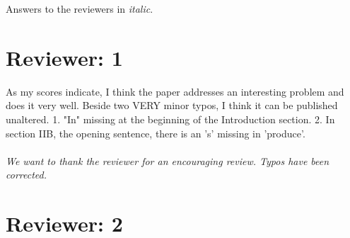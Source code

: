 \documentclass{article}
\begin{document}
Answers to the reviewers in \textit{italic}.

\section*{Reviewer: 1}

As my scores indicate, I think the paper addresses an interesting problem and does it very well. Beside two VERY minor typos, I think it can be published unaltered.
1. "In" missing at the beginning of the Introduction section.
2. In section IIB, the opening sentence, there is an 's' missing in 'produce'.
\\\\
\textit{We want to thank the reviewer for an encouraging review. Typos have been corrected.}

\section*{Reviewer: 2}
\end{document}
